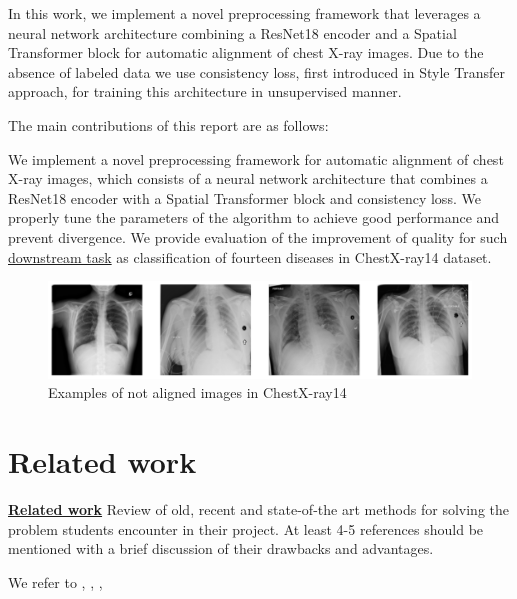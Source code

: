 \documentclass{article}
\begin{document}
In this work, we implement a novel preprocessing framework that leverages a 
 neural network architecture combining a ResNet18 encoder and a Spatial 
 Transformer block for automatic alignment of chest X-ray images. Due to the 
 absence of labeled data we use consistency loss, first introduced in Style 
 Transfer approach, for training this architecture in unsupervised manner.

The main contributions of this report are as follows:

We implement a novel preprocessing framework for automatic alignment of chest
 X-ray images, which consists of a neural network architecture that combines 
 a ResNet18 encoder with a Spatial Transformer block and consistency loss. 
We properly tune the parameters of the algorithm to achieve good performance
 and prevent divergence.
We provide evaluation of the improvement of quality for such 
\href{https://paperswithcode.com/sota/multi-label-classification-on-chestx-ray14}{downstream task}
 as classification of fourteen diseases in ChestX-ray14 dataset.

\begin{figure}[ht]\label{initial_images}
    \vskip 0.2in
    \begin{center}
    \centerline{\includegraphics[width=\columnwidth]{../images/initial_images.png}}
    \caption{Examples of not aligned images in ChestX-ray14}
    \end{center}
    \vskip -0.2in
\end{figure}

\section{Related work}\label{related_work}

\underline{\textbf{Related work}} Review of old, recent and state-of-the art methods
 for solving the problem students encounter in their project. At least 4-5 references should be mentioned with a brief discussion of their drawbacks and advantages. 
 
 We refer to \cite{DataSet}, \cite{XRayDiagnosis}, \cite{SpatialTransform}, \cite{StyleTransfer}
\end{document}
